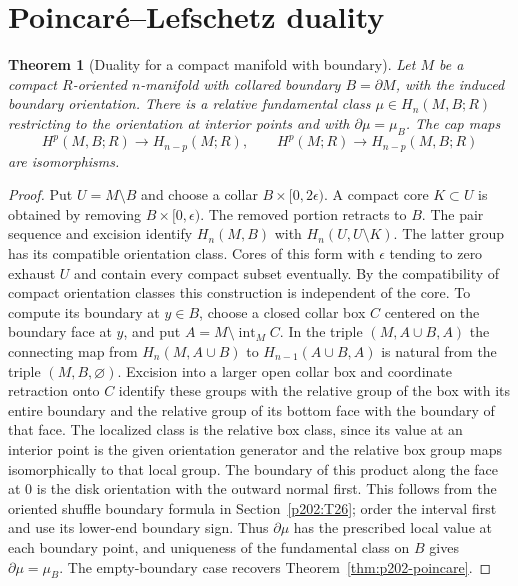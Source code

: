 \documentclass[11pt,oneside,openany]{book}
\theoremstyle{plain}
\newtheorem{theorem}{Theorem}[chapter]
\theoremstyle{definition}
\theoremstyle{remark}
\begin{document}
\section{Poincar\'e--Lefschetz duality}\label{p202:T31}

\begin{theorem}[Duality for a compact manifold with boundary]\label{thm:p202-lefschetz}
Let \(M\) be a compact \(R\)-oriented \(n\)-manifold with
collared boundary \(B=\partial M\), with the induced boundary
orientation. There is a relative fundamental class
\(\mu\in H_n(M,B;R)\) restricting to the orientation at
interior points and with \(\partial\mu=\mu_B\).
The cap maps
\[
 H^p(M,B;R)\longrightarrow H_{n-p}(M;R),\qquad
 H^p(M;R)\longrightarrow H_{n-p}(M,B;R)
\]
are isomorphisms.
\end{theorem}
\begin{proof}
Put \(U=M\setminus B\) and choose a collar \(B\times[0,2\epsilon)\).
A compact core \(K\subset U\) is obtained by removing
\(B\times[0,\epsilon)\). The removed portion retracts to
\(B\). The pair sequence and excision identify \(H_n(M,B)\)
with \(H_n(U,U\setminus K)\). The latter group has its
compatible orientation class. Cores of this form with
\(\epsilon\) tending to zero exhaust \(U\) and contain
every compact subset eventually. By the compatibility
of compact orientation classes this construction is
independent of the core. To compute its boundary at
\(y\in B\), choose a closed collar box \(C\) centered on
the boundary face at \(y\), and put \(A=M\setminus
\operatorname{int}_M C\). In the triple \((M,A\cup B,A)\)
the connecting map from \(H_n(M,A\cup B)\) to
\(H_{n-1}(A\cup B,A)\) is natural from the triple
\((M,B,\varnothing)\). Excision into a larger open collar
box and coordinate retraction onto \(C\) identify these
groups with the relative group of the box with its entire
boundary and the relative group of its bottom face with
the boundary of that face. The localized class is the
relative box class, since its value at an
interior point is the given orientation generator and the
relative box group maps isomorphically to that local group.
The boundary of this product along
the face at \(0\) is the disk orientation with the outward
normal first. This follows from the oriented shuffle
boundary formula in Section~\ref{p202:T26}; order the
interval first and use its lower-end boundary sign.
Thus \(\partial\mu\) has the prescribed local value
at each boundary point, and uniqueness of the fundamental
class on \(B\) gives \(\partial\mu=\mu_B\). The empty-boundary
case recovers Theorem~\ref{thm:p202-poincare}.


\end{proof}
\end{document}
